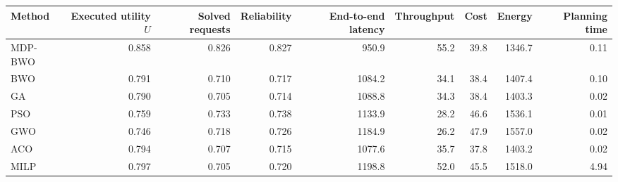 \begin{tabular}{lrrrrrrrr}\toprule
Method & Executed utility $U$ & Solved requests & Reliability & End-to-end latency & Throughput & Cost & Energy & Planning time\\\midrule
MDP-BWO & 0.858 & 0.826 & 0.827 & 950.9 & 55.2 & 39.8 & 1346.7 & 0.11\\
BWO & 0.791 & 0.710 & 0.717 & 1084.2 & 34.1 & 38.4 & 1407.4 & 0.10\\
GA & 0.790 & 0.705 & 0.714 & 1088.8 & 34.3 & 38.4 & 1403.3 & 0.02\\
PSO & 0.759 & 0.733 & 0.738 & 1133.9 & 28.2 & 46.6 & 1536.1 & 0.01\\
GWO & 0.746 & 0.718 & 0.726 & 1184.9 & 26.2 & 47.9 & 1557.0 & 0.02\\
ACO & 0.794 & 0.707 & 0.715 & 1077.6 & 35.7 & 37.8 & 1403.2 & 0.02\\
MILP & 0.797 & 0.705 & 0.720 & 1198.8 & 52.0 & 45.5 & 1518.0 & 4.94\\
\bottomrule
\end{tabular}
